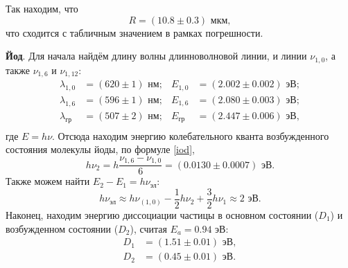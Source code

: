 Так находим, что
\begin{equation*}
    R = (10.8 \pm 0.3) \text{ мкм},
\end{equation*}
что сходится с табличным значением в рамках погрешности.



\textbf{Йод}.  Для начала найдём длину волны длинноволновой линии, и линии $\nu_{1,0}$, а также $\nu_{1, 6}$ и $\nu_{1,12}$:
\begin{align*}
    \lambda_{1, 0} &= (620 \pm 1) \text{ нм};       
    & E_{1, 0} &= (2.002 \pm 0.002) \text{ эВ};   \\
    \lambda_{1, 6} &= (596 \pm 1) \text{ нм};       
    & E_{1, 6} &= (2.080 \pm 0.003) \text{ эВ};    \\
    \lambda_{\text{гр}} &= (507 \pm 2) \text{ нм};  
    &  E_{\text{гр}} &= (2.447 \pm 0.006) \text{ эВ}, \\
\end{align*}
где $E= h \nu$. Отсюда находим энергию колебательного кванта возбужденного состояния молекулы йоды, по формуле \eqref{iod},
\begin{equation*}
    h \nu_2 = h \frac{\nu_{1, 6} - \nu_{1, 0}}{6} = (0.0130 \pm 0.0007) \text{ эВ}. 
\end{equation*}
Также можем найти $E_2 - E_1 = h \nu_{\text{эл}}$:
\begin{equation*}
    h \nu_{\text{эл}} \approx h \nu_{(1, 0)} - \frac{1}{2} h \nu_2  + \frac{3}{2} h \nu_1 \approx 2 \text{ эВ}.
\end{equation*}
Наконец, находим энергию диссоциации частицы в основном состоянии ($D_1$) и возбужденном состоянии ($D_2$), считая $E_a = 0.94$ эВ:
\begin{align*}
    D_1 &= (1.51 \pm 0.01) \text{ эВ}, \\
    D_2 &= (0.45 \pm 0.01) \text{ эВ}.
\end{align*}








